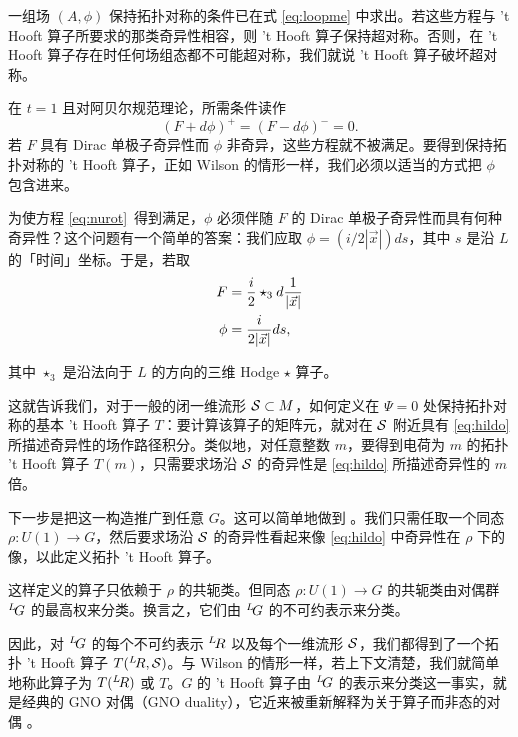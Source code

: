  一组场 $(A,\phi)$ 保持拓扑对称的条件已在式 \eqref{eq:loopme} 中求出。若这些方程与 't Hooft 算子所要求的那类奇异性相容，则 't Hooft 算子保持超对称。否则，在 't Hooft 算子存在时任何场组态都不可能超对称，我们就说 't Hooft 算子破坏超对称。

在 $t=1$ 且对阿贝尔规范理论，所需条件读作 %
\setcounter{equation}{7}
\begin{equation}\label{eq:nurot}
(F+d\phi)^+=(F-d\phi)^-=0.
\end{equation}
 若 $F$ 具有 Dirac 单极子奇异性而 $\phi$ 非奇异，这些方程就不被满足。要得到保持拓扑对称的 't Hooft 算子，正如 Wilson 的情形一样，我们必须以适当的方式把 $\phi$ 包含进来。

为使方程 \eqref{eq:nurot}\ 得到满足，$\phi$ 必须伴随 $F$ 的 Dirac 单极子奇异性而具有何种奇异性？这个问题有一个简单的答案：我们应取 $\phi=(i/2|\vec x|)ds$，其中 $s$ 是沿 $L$ 的「时间」坐标。于是，若取
\setcounter{equation}{8}
\begin{equation}\label{eq:hildo}
\begin{aligned}F& ={i\over 2}\star_3 d{1\over |\vec x|}\\
                    \phi& = {i\over 2|\vec x|} ds,\\\end{aligned}
\end{equation}

其中 $\star_3$ 是沿法向于 $L$ 的方向的三维 Hodge $\star$ 算子。

这就告诉我们，对于一般的闭一维流形 ${{\cal S}}\subset M$，如何定义在 $\Psi=0$ 处保持拓扑对称的基本 't Hooft 算子 $T$：要计算该算子的矩阵元，就对在 ${{\cal S}}$ 附近具有 \eqref{eq:hildo} 所描述奇异性的场作路径积分。类似地，对任意整数 $m$，要得到电荷为 $m$ 的拓扑 't Hooft 算子 $T(m)$，只需要求场沿 ${{\cal S}}$ 的奇异性是 \eqref{eq:hildo} 所描述奇异性的 $m$ 倍。

\par{}

下一步是把这一构造推广到任意 $G$。这可以简单地做到 \cite{ref90}。我们只需任取一个同态 $\rho:U(1)\to G$，然后要求场沿 ${{\cal S}}$ 的奇异性看起来像 \eqref{eq:hildo} 中奇异性在 $\rho$ 下的像，以此定义拓扑 't Hooft 算子。

这样定义的算子只依赖于 $\rho$ 的共轭类。但同态 $\rho:U(1)\to G$ 的共轭类由对偶群 $^L\negthinspace G$ 的最高权来分类。换言之，它们由 $^L\negthinspace G$ 的不可约表示来分类。

因此，对 $^L\negthinspace G$ 的每个不可约表示 $^L\negthinspace R$ 以及每个一维流形 ${{\cal S}}$，我们都得到了一个拓扑 't Hooft 算子 $T({}^L\negthinspace R,{{\cal S}})$。与 Wilson 的情形一样，若上下文清楚，我们就简单地称此算子为 $T({}^L\negthinspace R)$ 或 $T$。$G$ 的 't Hooft 算子由 $^L\negthinspace G$ 的表示来分类这一事实，就是经典的 GNO 对偶（GNO duality）\cite{ref10}，它近来被重新解释为关于算子而非态的对偶 \cite{ref90}。

